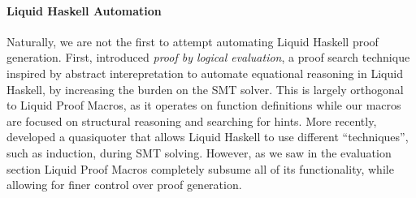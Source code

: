 \paragraph{Liquid Haskell Automation}
Naturally, we are not the first to attempt automating Liquid Haskell
proof generation.  First, \citet{VazouTCSNWJ18} introduced {\em proof
  by logical evaluation}, a proof search technique inspired by
abstract interepretation to automate equational reasoning in Liquid
Haskell, by increasing the burden on the SMT solver. This is largely
orthogonal to Liquid Proof Macros, as it operates on function
definitions while our macros are focused on structural reasoning and
searching for hints. More recently, \citet{TacticThesis} developed a
quasiquoter that allows Liquid Haskell to use different ``techniques'',
such as induction, during SMT solving. However, as we saw in the evaluation
section Liquid Proof Macros completely subsume all of its functionality,
while allowing for finer control over proof generation.
%  


